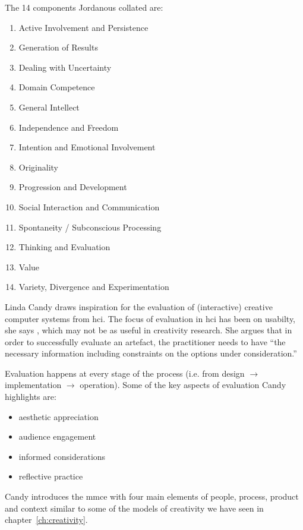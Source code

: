 The 14 components Jordanous collated are: \citeyear[p.118-120]{Jordanous2012}
\begin{enumerate}
  \item Active Involvement and Persistence
  \item Generation of Results
  \item Dealing with Uncertainty
  \item Domain Competence
  \item General Intellect
  \item Independence and Freedom
  \item Intention and Emotional Involvement
  \item Originality
  \item Progression and Development
  \item Social Interaction and Communication
  \item Spontaneity / Subconscious Processing
  \item Thinking and Evaluation
  \item Value
  \item Variety, Divergence and Experimentation
\end{enumerate}

\spirals

Linda Candy draws inspiration for the evaluation of (interactive) creative computer systems from \gls{hci}. The focus of evaluation in \gls{hci} has been on usabilty, she says \autocite[p.23]{Candy2012}, which may not be as useful in creativity research. She argues that in order to successfully evaluate an artefact, the practitioner needs to have ``the necessary information including constraints on the options under consideration.'' \autocite[p.7]{Candy2012}

Evaluation happens at every stage of the process (i.e. from design $\to$ implementation $\to$ operation). Some of the key aspects of evaluation Candy highlights are:

\begin{itemize}
  \item aesthetic appreciation
  \item audience engagement
  \item informed considerations
  \item reflective practice
\end{itemize}

Candy introduces the \gls{mmce} with four main elements of people, process, product and context \autocite[p.11]{Candy2012} similar to some of the models of creativity we have seen in chapter~\ref{ch:creativity}.

